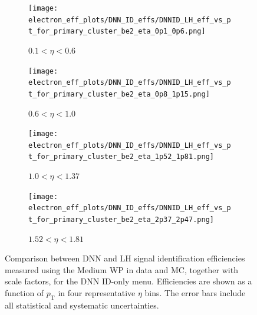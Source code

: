 \begin{figure}[htbp]
  \centering

  \begin{subfigure}[b]{0.48\textwidth}
    \centering
    \texttt{[image: electron\_eff\_plots/DNN\_ID\_effs/DNNID\_LH\_eff\_vs\_pt\_for\_primary\_cluster\_be2\_eta\_0p1\_0p6.png]}
    \caption{$0.1 < \eta < 0.6$}
    \label{fig:eff_dnn_lh_etabin1}
  \end{subfigure}
  \hfill
  \begin{subfigure}[b]{0.48\textwidth}
    \centering
    \texttt{[image: electron\_eff\_plots/DNN\_ID\_effs/DNNID\_LH\_eff\_vs\_pt\_for\_primary\_cluster\_be2\_eta\_0p8\_1p15.png]}
    \caption{$0.6 < \eta < 1.0$}
    \label{fig:eff_dnn_lh_etabin2}
  \end{subfigure}

  \vspace{0.5cm}

  \begin{subfigure}[b]{0.48\textwidth}
    \centering
    \texttt{[image: electron\_eff\_plots/DNN\_ID\_effs/DNNID\_LH\_eff\_vs\_pt\_for\_primary\_cluster\_be2\_eta\_1p52\_1p81.png]}
    \caption{$1.0 < \eta < 1.37$}
    \label{fig:eff_dnn_lh_etabin3}
  \end{subfigure}
  \hfill
  \begin{subfigure}[b]{0.48\textwidth}
    \centering
    \texttt{[image: electron\_eff\_plots/DNN\_ID\_effs/DNNID\_LH\_eff\_vs\_pt\_for\_primary\_cluster\_be2\_eta\_2p37\_2p47.png]}
    \caption{$1.52 < \eta < 1.81$}
    \label{fig:eff_dnn_lh_etabin4}
  \end{subfigure}

  \caption{
    Comparison between DNN and LH signal identification efficiencies measured using the Medium WP in data and MC, 
    together with scale factors, for the DNN ID-only menu. 
    Efficiencies are shown as a function of $p_{\mathrm{T}}$ in four representative $\eta$ bins. 
    The error bars include all statistical and systematic uncertainties.}
  \label{fig:eff_sfs_dnn_vs_lh_pt_4etabins}
\end{figure}



